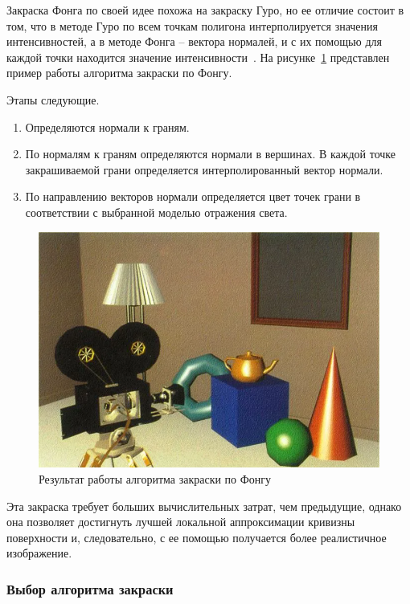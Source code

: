 Закраска Фонга по своей идее похожа на закраску Гуро, но ее отличие состоит в том, что в методе Гуро по всем точкам полигона интерполируется значения интенсивностей, а в методе Фонга – вектора нормалей, и с их помощью для каждой точки находится значение интенсивности~\cite{roders}.
На рисунке~\ref{img:fong} представлен пример работы алгоритма закраски по Фонгу.

Этапы следующие.
\begin{enumerate}
	\item Определяются нормали к граням.
	\item По нормалям к граням определяются нормали в вершинах. В каждой точке закрашиваемой грани определяется интерполированный вектор нормали.
	\item По направлению векторов нормали определяется цвет точек грани в соответствии с выбранной моделью отражения света.
\end{enumerate}

\begin{figure}[h]
	\centering
	\includegraphics[height=0.35\textheight]{img/fong.png}
	\caption{Результат работы алгоритма закраски по Фонгу}
	\label{img:fong}
\end{figure}

Эта закраска требует больших вычислительных затрат, чем предыдущие, однако она позволяет достигнуть лучшей локальной аппроксимации кривизны поверхности и, следовательно, с ее помощью получается более реалистичное изображение. 

\subsubsection {Выбор алгоритма закраски}

